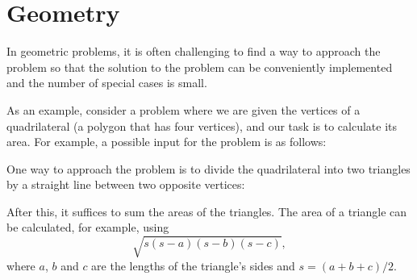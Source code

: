 \chapter{Geometry}


In geometric problems, it is often challenging
to find a way to approach the problem so that
the solution to the problem can be conveniently implemented
and the number of special cases is small.

As an example, consider a problem where
we are given the vertices of a quadrilateral
(a polygon that has four vertices),
and our task is to calculate its area.
For example, a possible input for the problem is as follows:

\begin{center}
\end{center}
One way to approach the problem is to divide
the quadrilateral into two triangles by a straight
line between two opposite vertices:
\begin{center}
\end{center}
After this, it suffices to sum the areas
of the triangles.
The area of a triangle can be calculated,
for example, using 
\[ \sqrt{s (s-a) (s-b) (s-c)},\]
where $a$, $b$ and $c$ are the lengths
of the triangle's sides and
$s=(a+b+c)/2$.

